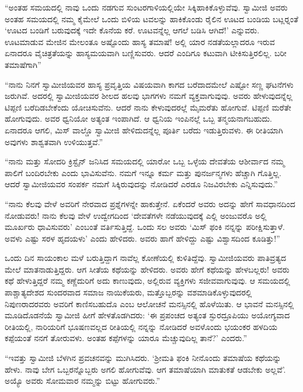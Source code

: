  “ಅಂತಹ ಸಮಯದಲ್ಲಿ ನಾವು ಒಂದು ನಡಗುವ ಸುಂಟರಗಾಳಿಯಲ್ಲಿಯೇ ಸಿಕ್ಕಿಹಾಕಿಕೊಳ್ಳುವೆವು. ಸ್ವಾಮೀಜಿ ಅವರು ಅಂತಹ ಸಮಯದಲ್ಲಿ ನಮ್ಮ ಕೈಮೇಲೆ ಒಂದು ಬಿಳಿಯ ಟವಲನ್ನು ಹಾಕಿಕೊಂಡು ರೈಲಿನ ಊಟದ ಬಂಡಿಯ ಬಟ್ಲರ್‍ನಂತೆ ‘ಊಟದ ಬಂಡಿಗೆ ಬರುವುದಕ್ಕೆ ಇದೇ ಕೊನೆಯ ಕರೆ. ಊಟವನ್ನೆಲ್ಲ ಆಗಲೆ ಬಡಿಸಿ ಆಗಿದೆ!’ ಎನ್ನುವರು. ಊಟಮಾಡುವ ಮೇಜಿನ ಮೇಲಂತೂ ಅಷ್ಟೊಂದು ಹಾಸ್ಯ ತಮಾಷೆ! ಅಲ್ಲಿ ಯಾರ ನಡತೆಯಲ್ಲಾದರೂ ಇರುವ ಏನಾದರೂ ವೈಚಿತ್ರತೆಯನ್ನು ಹಾಸ್ಯಮಯವಾಗಿ ಬಣ್ಣಿಸುವರು. ಆದರೆ ಎಂದಿಗೂ ಕಟುವಾಗಿ ಟೀಕಿಸುತ್ತಿರಲಿಲ್ಲ. ಬರೀ ತಮಾಷೆಗಾಗಿ” 

 “ನಾನು ನಿನಗೆ ಸ್ವಾಮೀಜಿಯವರ ಹಾಸ್ಯ ಪ್ರವೃತ್ತಿಯ ವಿಷಯವಾಗಿ ಕಾಗದ ಬರೆದಾದಮೇಲೆ ಎಷ್ಟೋ ಸಣ್ಣ ಘಟನೆಗಳು ಜರುಗಿವೆ. ಅದರಲ್ಲಿ ಸ್ವಾಮೀಜಿಯವರ ಶೀಲದ ಹಲವು ಭಾಗಗಳು ನಮಗೆ ವ್ಯಕ್ತವಾಗುವುವು. ಅವರು ಹೇಳುವುದನ್ನೆಲ್ಲ ಟಿಪ್ಪಣಿ ಬರೆದಿಡಬೇಕೆಂದು ಯೋಚಿಸುವೆನು. ಆದರೆ ನಾನು ಕೇಳುವುದರಲ್ಲೆ ಮೈಮರೆತು ಹೋಗುವೆ. ಟಿಪ್ಪಣಿ ಮರೆತೇ ಹೋಗುವುದು. ಅವರ ಧ್ವನಿಯೋ ಅತ್ಯಂತ ಇಂಪಾಗಿದೆ. ಆ ಧ್ವನಿಯ ಇಂಪಿನಲ್ಲೆ ಒಬ್ಬ ತನ್ಮಯನಾಗಬಹುದು. ಏನಾದರೂ ಆಗಲಿ, ಮಿಸ್ ವಾಲ್ಡೊ ಸ್ವಾಮೀಜಿ ಹೇಳಿದುದನ್ನೆಲ್ಲ ಪೂರ್ತಿ ಬರೆದು ಇಡುತ್ತಿರುವಳು. ಈ ರೀತಿಯಾಗಿ ಅವುಗಳು ಶಾಶ್ವತವಾಗಿ ಉಳಿಯುತ್ತವೆ.” 

 “ನಾನು ಮತ್ತು ಸೋದರಿ ಕ್ರಿಸ್ಟೈನ್ ಜನಿಸಿದ ಸಮಯದಲ್ಲಿ ಯಾರೋ ಒಬ್ಬ ಒಳ್ಳೆಯ ದೇವತೆಯ ಆಶೀರ್ವಾದ ನಮ್ಮ ಪಾಲಿಗೆ ಬಂದಿರಬೇಕು ಎಂದು ಭಾವಿಸುವೆನು. ನಮಗೆ ಇನ್ನೂ ಕರ್ಮ ಮತ್ತು ಪುನರ್ಜನ್ಮಗಳು ಹೆಚ್ಚಾಗಿ ಗೊತ್ತಿಲ್ಲ. ಆದರೆ ಸ್ವಾಮೀಜಿಯವರ ಸಂಪರ್ಕ ನಮಗೆ ಸಿಕ್ಕಿರುವುದನ್ನು ನೋಡಿದರೆ ಎರಡೂ ನಿಜವಿರಬೇಕು ಎನ್ನಿಸುವುದು.” 

 “ನಾನು ಕೆಲವು ವೇಳೆ ಅವರಿಗೆ ನೇರವಾದ ಪ್ರಶ್ನೆಗಳನ್ನೇ ಹಾಕುತ್ತೇನೆ. ಏಕೆಂದರೆ ಅವರು ಅದನ್ನು ಹೇಗೆ ಸಾವಧಾನದಿಂದ ನೋಡುವರು! ನಾನು ಕೆಲವು ವೇಳೆ ಉದ್ವೇಗದಿಂದ ‘ದೇವತೆಗಳೇ ನಡೆಯುವುದಕ್ಕೆ ಎಲ್ಲಿ ಅಂಜುವರೊ ಅಲ್ಲಿ ಮೂರ್ಖರು ಧಾವಿಸುವರು’ ಎಂಬಂತೆ ವರ್ತಿಸುತ್ತಿದ್ದೆ. ಒಂದು ಸಲ ಅವರು ‘ಮಿಸ್ ಫಂಕಿ ನನ್ನನ್ನು ಪರೀಕ್ಷಿಸುತ್ತಾಳೆ. ಅವಳು ಎಷ್ಟು ಸರಳ ಹೃದಯಳು’ ಎಂದು ಹೇಳಿದರು. ಅವರು ಹಾಗೆ ಹೇಳಿದ್ದು ಎಷ್ಟು ವಿಶ್ವಾಸದಿಂದ ಕೂಡಿತ್ತು!” 

 ಒಂದು ದಿನ ಸಾಯಂಕಾಲ ಮಳೆ ಬರುತ್ತಿದ್ದಾಗ ನಾವೆಲ್ಲ ಕೋಣೆಯಲ್ಲಿ ಕುಳಿತಿದ್ದೆವು. ಸ್ವಾಮೀಜಿಯವರು ಪಾತಿವ್ರತ್ಯದ ಮೇಲೆ ಮಾತನಾಡುತ್ತಿದ್ದರು. ಆಗ ಸೀತೆಯ ಕಥೆಯನ್ನು ಹೇಳಿದರು. ಅವರು ಹೇಗೆ ಕಥೆಯನ್ನು ಹೇಳಬಲ್ಲರು! ಅವರು ಕಥೆ ಹೇಳುತ್ತಿದ್ದರೆ ನಮ್ಮ ಕಣ್ಣೆದುರಿಗೆ ಅದು ಕಾಣುವುದು, ಅಲ್ಲಿರುವ ವ್ಯಕ್ತಿಗಳು ಸಜೀವವಾಗುವುವು. ಆ ಸಮಯದಲ್ಲಿ ಪಾಶ್ಚಾತ್ಯದೇಶದ ಸುಂದರವಾದ ಸಮಾಜ ನಾಯಿಕೆಯರು, ಮತ್ತೊಬ್ಬರನ್ನು ವಶಮಾಡಿಕೊಳ್ಳುವುದರಲ್ಲಿ ನಿಪುಣರಾದರವರು ಅವರಿಗೆ ಕಾಣಿಸಬಹುದೊ ಎಂಬ ಆಲೋಚನೆ ಮನಸ್ಸಿನಲ್ಲಿ ಹೊಳೆಯಿತು. ಆ ಭಾವನೆ ಮನಸ್ಸಿನಲ್ಲಿ ಮೂಡಿದೊಡನೆಯೆ ಸ್ವಾಮೀಜಿ ಹೀಗೆ ಹೇಳತೊಡಗಿದರು: ‘ಈ ಪ್ರಪಂಚದ ಅತ್ಯಂತ ಸ್ಫುರದ್ರೂಪಿಯು ಅಯೋಗ್ಯವಾದ ರೀತಿಯಲ್ಲಿ, ನಾರಿಯರಿಗೆ ಭೂಷಣವಲ್ಲದ ರೀತಿಯಲ್ಲಿ ನನ್ನನ್ನು ನೋಡಿದರೆ ಅವಳೊಂದು ಭಯಂಕರ ಹಳದಿಯ ಕಪ್ಪೆಯಂತೆ ನನಗೆ ತೋರುವಳು. ಅಂತಹ ಕಪ್ಪೆಗಳನ್ನು ಯಾರೂ ಮೆಚ್ಚುವುದಿಲ್ಲ ತಾನೆ?’ ಎಂದರು.” 

 “ಇವತ್ತು ಸ್ವಾಮೀಜಿ ಬೆಳಗಿನ ಪ್ರವಚನವನ್ನು ಮುಗಿಸಿದರು. ‘ಶ‍್ರೀಮತಿ ಫಂಕಿ ನೀನೊಂದು ತಮಾಷೆಯ ಕಥೆಯನ್ನು ಹೇಳು. ನಾವು ಬೇಗ ಒಬ್ಬರನ್ನೊಬ್ಬರು ಅಗಲಿ ಹೋಗುವೆವು. ಆಗ ತಮಾಷೆಯಾಗಿ ಮಾತುಕತೆ ಆಡಬೇಕು ಅಲ್ಲವೆ’. ಅಯ್ಯೊ ಅವರು ಸೋಮವಾರ ನಮ್ಮನ್ನು ಬಿಟ್ಟು ಹೋಗುವರು.” 

